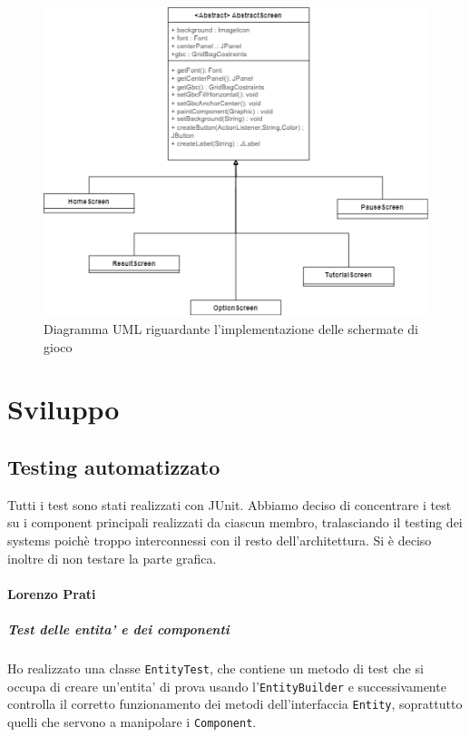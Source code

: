 \documentclass[a4paper,12pt]{report}
\begin{document}
	\begin{figure}[h]
		\centering
		\includegraphics[width=\textwidth]{uml/uml_Screens.png}
		\caption{Diagramma UML riguardante l'implementazione delle schermate di gioco}
	\end{figure}
	

\chapter{Sviluppo}

\section{Testing automatizzato}

Tutti i test sono stati realizzati con JUnit. Abbiamo deciso di concentrare i test su i component principali realizzati da ciascun membro, tralasciando il testing dei systems poichè troppo interconnessi con il resto dell'architettura.
Si è deciso inoltre di non testare la parte grafica.

\subsubsection*{Lorenzo Prati}

\paragraph*{Test delle entita' e dei componenti}
Ho realizzato una classe \texttt{EntityTest}, che contiene un metodo di test che si occupa di creare un'entita' di prova usando l'\texttt{EntityBuilder} e successivamente controlla il corretto funzionamento dei metodi dell'interfaccia \texttt{Entity}, soprattutto quelli che servono a manipolare i \texttt{Component}.
\end{document}
